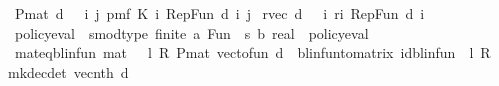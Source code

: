 \begin{isabellebody}
%
\endisatagproof
{\isafoldproof}%
%
\isadelimproof
\isanewline
%
\endisadelimproof
\isanewline
{}\isamarkupfalse%
\ {\isachardoublequoteopen}P{\isacharunderscore}{\kern0pt}mat\ d\ {\isacharequal}{\kern0pt}\ {\isacharparenleft}{\kern0pt}{\isasymchi}\ i\ j{\isachardot}{\kern0pt}\ pmf\ {\isacharparenleft}{\kern0pt}K\ {\isacharparenleft}{\kern0pt}i{\isacharcomma}{\kern0pt}\ Rep{\isacharunderscore}{\kern0pt}Fun\ d\ i{\isacharparenright}{\kern0pt}{\isacharparenright}{\kern0pt}\ j{\isacharparenright}{\kern0pt}{\isachardoublequoteclose}\isanewline
\isanewline
{}\isamarkupfalse%
\ {\isachardoublequoteopen}r{\isacharunderscore}{\kern0pt}vec{\isacharprime}{\kern0pt}\ d\ {\isacharequal}{\kern0pt}\ {\isacharparenleft}{\kern0pt}{\isasymchi}\ i{\isachardot}{\kern0pt}\ r{\isacharparenleft}{\kern0pt}i{\isacharcomma}{\kern0pt}\ Rep{\isacharunderscore}{\kern0pt}Fun\ d\ i{\isacharparenright}{\kern0pt}{\isacharparenright}{\kern0pt}{\isachardoublequoteclose}\isanewline
\isanewline
{}\isamarkupfalse%
\ policy{\isacharunderscore}{\kern0pt}eval{\isacharprime}{\kern0pt}\ {\isacharcolon}{\kern0pt}{\isacharcolon}{\kern0pt}\ {\isachardoublequoteopen}{\isacharparenleft}{\kern0pt}{\isacharprime}{\kern0pt}s{\isacharcolon}{\kern0pt}{\isacharcolon}{\kern0pt}{\isacharbraceleft}{\kern0pt}mod{\isacharunderscore}{\kern0pt}type{\isacharcomma}{\kern0pt}\ finite{\isacharbraceright}{\kern0pt}{\isacharcomma}{\kern0pt}\ {\isacharprime}{\kern0pt}a{\isacharparenright}{\kern0pt}\ Fun\ {\isasymRightarrow}\ {\isacharparenleft}{\kern0pt}{\isacharprime}{\kern0pt}s\ {\isasymRightarrow}\isactrlsub b\ real{\isacharparenright}{\kern0pt}{\isachardoublequoteclose}\ \ {\isachardoublequoteopen}policy{\isacharunderscore}{\kern0pt}eval{\isachardoublequoteclose}%
\isadelimproof
%
\endisadelimproof
%
\isatagproof
\isacommand{{\isachardot}{\kern0pt}}\isamarkupfalse%
%
\endisatagproof
{\isafoldproof}%
%
\isadelimproof
%
\endisadelimproof
\isanewline
\isanewline
{}\isamarkupfalse%
\ mat{\isacharunderscore}{\kern0pt}eq{\isacharunderscore}{\kern0pt}blinfun{\isacharcolon}{\kern0pt}\ {\isachardoublequoteopen}mat\ {}\ {\isacharminus}{\kern0pt}\ l\ {\isacharasterisk}{\kern0pt}\isactrlsub R\ {\isacharparenleft}{\kern0pt}P{\isacharunderscore}{\kern0pt}mat\ {\isacharparenleft}{\kern0pt}vec{\isacharunderscore}{\kern0pt}to{\isacharunderscore}{\kern0pt}fun\ d{\isacharparenright}{\kern0pt}{\isacharparenright}{\kern0pt}\ {\isacharequal}{\kern0pt}\ blinfun{\isacharunderscore}{\kern0pt}to{\isacharunderscore}{\kern0pt}matrix\ {\isacharparenleft}{\kern0pt}id{\isacharunderscore}{\kern0pt}blinfun\ {\isacharminus}{\kern0pt}\ l\ {\isacharasterisk}{\kern0pt}\isactrlsub R\ {\isasymP}\ {\isacharparenleft}{\kern0pt}mk{\isacharunderscore}{\kern0pt}dec{\isacharunderscore}{\kern0pt}det\ {\isacharparenleft}{\kern0pt}vec{\isacharunderscore}{\kern0pt}nth\ d{\isacharparenright}{\kern0pt}{\isacharparenright}{\kern0pt}{\isacharparenright}{\kern0pt}{\isachardoublequoteclose}\isanewline

\end{isabellebody}
